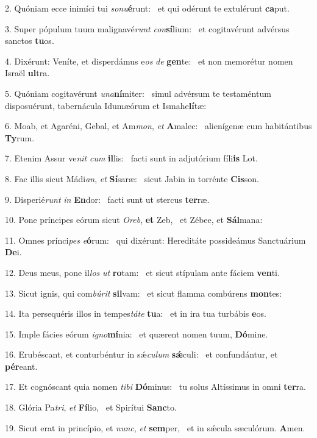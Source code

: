 2. Quóniam ecce inimíci tui \textit{so}\textit{nu}\textbf{é}runt: \ast\  et qui odérunt te extulérunt \textbf{ca}put.\

3. Super pópulum tuum malignavé\textit{runt} \textit{con}\textbf{sí}lium: \ast\  et cogitavérunt advérsus sanctos \textbf{tu}os.\

4. Dixérunt: Veníte, et disperdámus e\textit{os} \textit{de} \textbf{gen}te: \ast\  et non memorétur nomen Israël \textbf{ul}tra.\

5. Quóniam cogitavérunt \textit{u}\textit{na}\textbf{ní}miter: \ast\  simul advérsum te testaméntum disposuérunt, tabernácula Idumæórum et Ismahe\textbf{lí}tæ:\

6. Moab, et Agaréni, Gebal, et Am\textit{mon}, \textit{et} \textbf{A}malec: \ast\  alienígenæ cum habitántibus \textbf{Ty}rum.\

7. Etenim Assur ve\textit{nit} \textit{cum} \textbf{il}lis: \ast\  facti sunt in adjutórium fíli\textbf{is} Lot.\

8. Fac illis sicut Mádi\textit{an}, \textit{et} \textbf{Sí}saræ: \ast\  sicut Jabin in torrénte \textbf{Cis}son.\

9. Disperié\textit{runt} \textit{in} \textbf{En}dor: \ast\  facti sunt ut stercus \textbf{ter}ræ.\

10. Pone príncipes eórum sicut \textit{O}\textit{reb}, \textbf{et} Zeb, \ast\  et Zébee, et \textbf{Sál}mana:\

11. Omnes prínci\textit{pes} \textit{e}\textbf{ó}rum: \ast\  qui dixérunt: Hereditáte possideámus Sanctuárium \textbf{De}i.\

12. Deus meus, pone il\textit{los} \textit{ut} \textbf{ro}tam: \ast\  et sicut stípulam ante fáciem \textbf{ven}ti.\

13. Sicut ignis, qui com\textit{bú}\textit{rit} \textbf{sil}vam: \ast\  et sicut flamma combúrens \textbf{mon}tes:\

14. Ita persequéris illos in tempes\textit{tá}\textit{te} \textbf{tu}a: \ast\  et in ira tua turbábis \textbf{e}os.\

15. Imple fácies eórum \textit{i}\textit{gno}\textbf{mí}nia: \ast\  et quærent nomen tuum, \textbf{Dó}mine.\

16. Erubéscant, et conturbéntur in sǽ\textit{cu}\textit{lum} \textbf{sǽ}culi: \ast\  et confundántur, et \textbf{pér}eant.\

17. Et cognóscant quia nomen \textit{ti}\textit{bi} \textbf{Dó}minus: \ast\  tu solus Altíssimus in omni \textbf{ter}ra.\

18. Glória Pa\textit{tri}, \textit{et} \textbf{Fí}lio, \ast\  et Spirítui \textbf{Sanc}to.\

19. Sicut erat in princípio, et \textit{nunc}, \textit{et} \textbf{sem}per, \ast\  et in sǽcula sæculórum. \textbf{A}men.\

